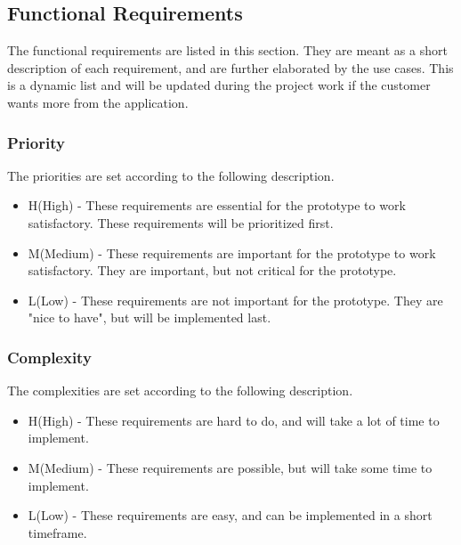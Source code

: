 \subsection{Functional Requirements}
The functional requirements are listed in this section. 
They are meant as a short description of each requirement, 
and are further elaborated by the use cases. 
This is a dynamic list and will be updated during the project work if the customer wants more from the application.

\subsubsection{Priority}
The priorities are set according to the following description.
\begin{itemize}
	 \item H(High) - These requirements are essential for the prototype to work satisfactory. These requirements will be prioritized first.
	\item M(Medium) - These requirements are important for the prototype to work satisfactory. They are important, but not critical for the prototype.
	\item L(Low) - These requirements are not important for the prototype. They are "nice to have", but will be implemented last.
\end{itemize}

\subsubsection{Complexity}
The complexities are set according to the following description.
\begin{itemize}
	\item H(High) - These requirements are hard to do, and will take a lot of time to implement. 
	\item M(Medium) - These requirements are possible, but will take some time to implement.
	\item L(Low) - These requirements are easy, and can be implemented in a short timeframe.
\end{itemize}

